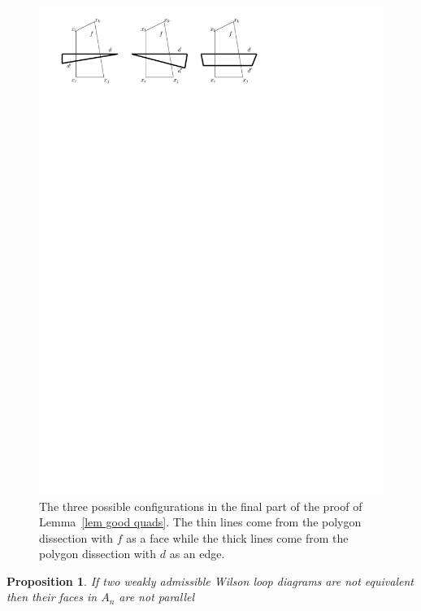 \documentclass[11pt]{article}
\newtheorem{prop}[thm]{Proposition}
\theoremstyle{remark}
\theoremstyle{definition}
\begin{document}
\begin{figure}
\includegraphics{inductive_step} 
\caption{The three possible configurations in the final part of the proof of Lemma~\ref{lem good quads}.  The thin lines come from the polygon dissection with $f$ as a face while the thick lines come from the polygon dissection with $d$ as an edge.}\label{inductive_step}
\end{figure}

\begin{prop}\label{prop hard way}
  If two weakly admissible Wilson loop diagrams are not equivalent then their faces in $A_n$ are not parallel
\end{prop}
\end{document}
